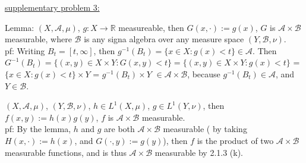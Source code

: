 \documentclass[12pt]{article}
\newcommand{\reals}[0] { \mathbb{R}}
\newcommand{\A}[0] { \mathcal{A} }
\newcommand{\B}[0] { \mathcal{B} }
\begin{document}
\begin{flushleft}
\underline{supplementary problem 3:}
\end{flushleft}

\begin{flushleft}
Lemma: $ (X, \A, \mu )$, $g: X \rightarrow \reals$ measureable, then $G(x, \cdot ) := g(x)$, $G$ is $\A \times \B$ measurable, where $\B$ is any signa algebra over any measure space $ (Y, \B, \nu )$. \\
pf: Writing $B_t = [ t,  \infty ]$, then $g^{-1} (B_t) = \{ x \in X: g(x) < t \} \in \A$. Then $G^{-1} (B_t) = \{ (x,y) \in X \times Y: G(x,y) < t  \} = \{ (x,y) \in X \times Y: g(x) < t  \} $ = 
$  \{ x \in X: g(x) < t  \} \times Y $ = $g^{-1} (B_t) \times Y$ $ \in \A \times \B$, because $g^{-1} (B_t) \in \A$, and $Y \in \B$.
\end{flushleft}


\begin{flushleft}
$ (X, \A, \mu )$, $ (Y, \B, \nu )$, $h \in L^1( X, \mu )$, $g \in L^1( Y, \nu )$, then $f(x,y) := h(x) g(y)$, $f$ is $\A \times \B$ measurable. \\
pf: By the lemma, $h$ and $g$ are both $\A \times \B$ measurable ( by taking $H(x, \cdot) := h(x) $, and $G(\cdot, y) := g(y) $), then $f$ is the product of two $\A \times \B$ measurable functions, and is thus $\A \times \B$ measurable by 2.1.3 (k).
\end{flushleft}
\end{document}
